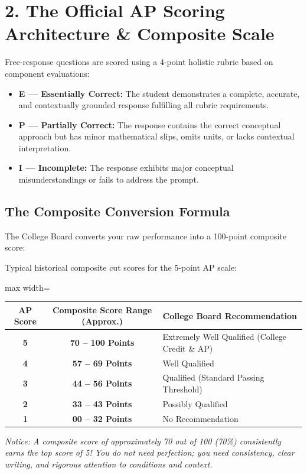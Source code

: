 \section*{2. The Official AP Scoring Architecture \& Composite Scale}
Free-response questions are scored using a 4-point holistic rubric based on component evaluations:
\begin{itemize}[leftmargin=1.5em]
  \item \textbf{E --- Essentially Correct:} The student demonstrates a complete, accurate, and contextually grounded response fulfilling all rubric requirements.
  \item \textbf{P --- Partially Correct:} The response contains the correct conceptual approach but has minor mathematical slips, omits units, or lacks contextual interpretation.
  \item \textbf{I --- Incomplete:} The response exhibits major conceptual misunderstandings or fails to address the prompt.
\end{itemize}

\subsection*{The Composite Conversion Formula}
The College Board converts your raw performance into a 100-point composite score:
\begin{center}
\end{center}
Typical historical composite cut scores for the 5-point AP scale:
\begin{center}
\begin{adjustbox}{max width=\linewidth}
\begin{tabular}{ccl}
\toprule
\textbf{AP Score} & \textbf{Composite Score Range (Approx.)} & \textbf{College Board Recommendation} \\
\midrule
\textbf{5} & \textbf{70 -- 100 Points} & Extremely Well Qualified (College Credit \& AP) \\
\textbf{4} & \textbf{57 -- 69 Points} & Well Qualified \\
\textbf{3} & \textbf{44 -- 56 Points} & Qualified (Standard Passing Threshold) \\
\textbf{2} & \textbf{33 -- 43 Points} & Possibly Qualified \\
\textbf{1} & \textbf{00 -- 32 Points} & No Recommendation \\
\bottomrule
\end{tabular}
\end{adjustbox}
\end{center}
\textit{Notice: A composite score of approximately 70 out of 100 (70\%) consistently earns the top score of 5! You do not need perfection; you need consistency, clear writing, and rigorous attention to conditions and context.}

